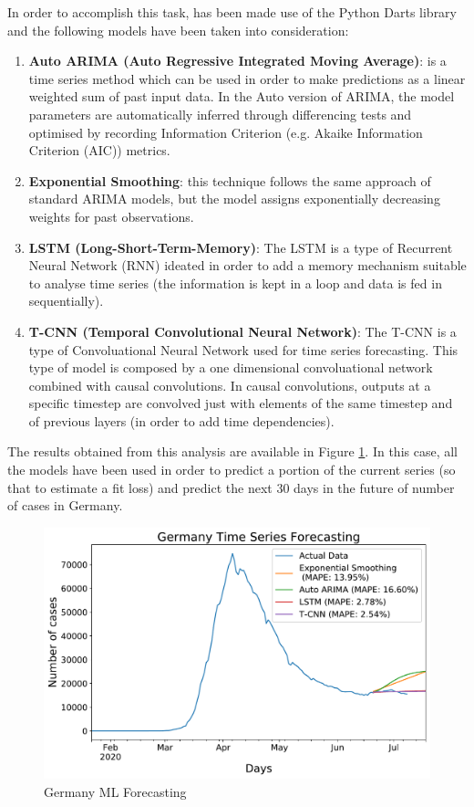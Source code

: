 In order to accomplish this task, has been made use of the Python Darts library \cite{darts} and the following models have been taken into consideration:
\begin{enumerate}
    \item \textbf{Auto ARIMA (Auto Regressive Integrated Moving Average)}: is a time series method which can be used in order to make predictions as a linear weighted sum of past input data. In the Auto version of ARIMA, the model parameters are automatically inferred through differencing tests and optimised by recording Information Criterion (e.g. Akaike Information Criterion (AIC)) metrics.
    \item \textbf{Exponential Smoothing}: this technique follows the same approach of standard ARIMA models, but the model assigns exponentially decreasing weights for past observations.
    \item \textbf{LSTM (Long-Short-Term-Memory)}: The LSTM is a type of Recurrent Neural Network (RNN) ideated in order to add a memory mechanism suitable to analyse time series (the information is kept in a loop and data is fed in sequentially).
    \item \textbf{T-CNN (Temporal Convolutional Neural Network)}: The T-CNN is a type of Convoluational Neural Network used for time series forecasting. This type of model is composed by a one dimensional convoluational network combined with causal convolutions. In causal convolutions, outputs at a specific timestep are convolved just with elements of the same timestep and of previous layers (in order to add time dependencies).
\end{enumerate}

The results obtained from this analysis are available in Figure \ref{ml_forecast}. In this case, all the models have been used in order to predict a portion of the current series (so that to estimate a fit loss) and predict the next 30 days in the future of number of cases in Germany.

\begin{figure}[ht!]%
    \centering
    \includegraphics[width=0.55\linewidth]{latex/images/Germany_darts.pdf}
    \vspace{-0.2cm}
    \caption{Germany ML Forecasting}
    \label{ml_forecast}
\end{figure}

